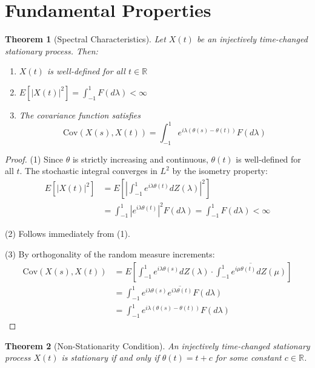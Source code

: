\documentclass[11pt]{article}
\newtheorem{theorem}{Theorem}
\begin{document}
\section{Fundamental Properties}

\begin{theorem}[Spectral Characteristics]
Let $X(t)$ be an injectively time-changed stationary process. Then:
\begin{enumerate}
\item $X(t)$ is well-defined for all $t \in \mathbb{R}$
\item $E[|X(t)|^2] = \int_{-1}^1 F(d\lambda) < \infty$
\item The covariance function satisfies
\begin{equation}
\text{Cov}(X(s),X(t)) = \int_{-1}^1 e^{i\lambda(\theta(s)-\theta(t))} F(d\lambda)
\end{equation}
\end{enumerate}
\end{theorem}

\begin{proof}
(1) Since $\theta$ is strictly increasing and continuous, $\theta(t)$ is well-defined for all $t$. The stochastic integral converges in $L^2$ by the isometry property:
\begin{align}
E[|X(t)|^2] &= E\left[\left|\int_{-1}^1 e^{i\lambda\theta(t)} dZ(\lambda)\right|^2\right]\\
&= \int_{-1}^1 |e^{i\lambda\theta(t)}|^2 F(d\lambda) = \int_{-1}^1 F(d\lambda) < \infty
\end{align}

(2) Follows immediately from (1).

(3) By orthogonality of the random measure increments:
\begin{align}
\text{Cov}(X(s),X(t)) &= E\left[\int_{-1}^1 e^{i\lambda\theta(s)} dZ(\lambda) \cdot \overline{\int_{-1}^1 e^{i\mu\theta(t)} dZ(\mu)}\right]\\
&= \int_{-1}^1 e^{i\lambda\theta(s)} \overline{e^{i\lambda\theta(t)}} F(d\lambda)\\
&= \int_{-1}^1 e^{i\lambda(\theta(s)-\theta(t))} F(d\lambda)
\end{align}
\end{proof}

\begin{theorem}[Non-Stationarity Condition]
An injectively time-changed stationary process $X(t)$ is stationary if and only if $\theta(t) = t + c$ for some constant $c \in \mathbb{R}$.
\end{theorem}
\end{document}
